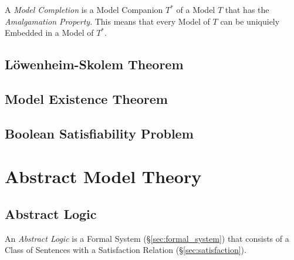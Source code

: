 A \emph{Model Completion} is a Model Companion $T^*$ of a Model $T$
that has the \emph{Amalgamation Property}. This means that every Model
of $T$ can be uniquiely Embedded in a Model of $T^*$.



\subsection{L\"owenheim-Skolem Theorem}\label{sec:lowenheim_skolem}

\subsection{Model Existence Theorem}\label{sec:model_existence}



\subsection{Boolean Satisfiability Problem}
\label{sec:boolean_satisfiability}



\section{Abstract Model Theory}\label{sec:abstract_model}

\subsection{Abstract Logic}\label{sec:abstract_logic}

An \emph{Abstract Logic} is a Formal System
(\S\ref{sec:formal_system}) that consists of a Class of Sentences with
a Satisfaction Relation (\S\ref{sec:satisfaction}).




